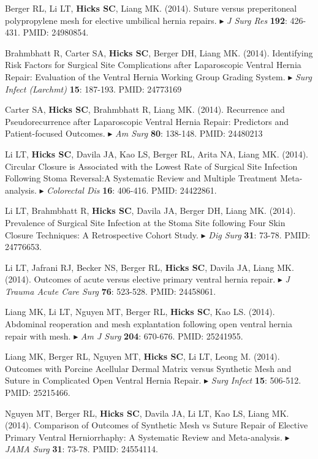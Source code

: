 \documentclass[10pt]{article}
\newcommand{\dg}[1]{{\color{black} $\blacktriangleright$ {#1}}}
\begin{document}
\item Berger RL, Li LT, {\bf Hicks SC}, Liang MK. (2014). Suture versus preperitoneal polypropylene mesh for elective umbilical hernia repairs. \dg{{\it J Surg Res} {\bf 192}: 426-431. PMID: 24980854}.
\item Brahmbhatt R, Carter SA, {\bf Hicks SC}, Berger DH, Liang MK. (2014). Identifying Risk Factors for Surgical Site Complications after Laparoscopic Ventral Hernia Repair: Evaluation of the Ventral Hernia Working Group Grading System. \dg{{\it Surg Infect (Larchmt)} {\bf 15}: 187-193. PMID: 24773169}
\item Carter SA, {\bf Hicks SC}, Brahmbhatt R, Liang MK. (2014). Recurrence and Pseudorecurrence after Laparoscopic Ventral Hernia Repair: Predictors and Patient-focused Outcomes. \dg{{\it Am Surg} {\bf 80}: 138-148. PMID: 24480213}
\item Li LT, {\bf Hicks SC}, Davila JA, Kao LS, Berger RL, Arita NA, Liang MK. (2014). Circular Closure is Associated with the Lowest Rate of Surgical Site Infection Following Stoma Reversal:A Systematic Review and Multiple Treatment Meta-analysis. \dg{{\it Colorectal Dis} {\bf 16}: 406-416. PMID: 24422861}.
\item Li LT, Brahmbhatt R, {\bf Hicks SC}, Davila JA, Berger DH, Liang MK. (2014). Prevalence of Surgical Site Infection at the Stoma Site following Four Skin Closure Techniques: A Retrospective Cohort Study. \dg{{\it Dig Surg} {\bf 31}: 73-78. PMID: 24776653}.
\item Li LT, Jafrani RJ, Becker NS, Berger RL,  {\bf Hicks SC}, Davila JA, Liang MK. (2014). Outcomes of acute versus elective primary ventral hernia repair. \dg{{\it J Trauma Acute Care Surg} {\bf 76}: 523-528. PMID: 24458061}.
\item Liang MK, Li LT, Nguyen MT, Berger RL, {\bf Hicks SC}, Kao LS. (2014). Abdominal reoperation and mesh explantation following open ventral hernia repair with mesh. \dg{{\it Am J Surg} {\bf 204}: 670-676. PMID: 25241955}.
\item Liang MK, Berger RL, Nguyen MT, {\bf Hicks SC}, Li LT, Leong M. (2014). Outcomes with Porcine Acellular Dermal Matrix versus Synthetic Mesh and Suture in Complicated Open Ventral Hernia Repair. \dg{{\it Surg Infect} {\bf 15}: 506-512. PMID: 25215466}.
\item Nguyen MT, Berger RL, {\bf Hicks SC}, Davila JA, Li LT, Kao LS, Liang MK. (2014). Comparison of Outcomes of Synthetic Mesh vs Suture Repair of Elective Primary Ventral Herniorrhaphy: A Systematic Review and Meta-analysis. \dg{{\it JAMA Surg} {\bf 31}: 73-78. PMID: 24554114}.
\end{document}
